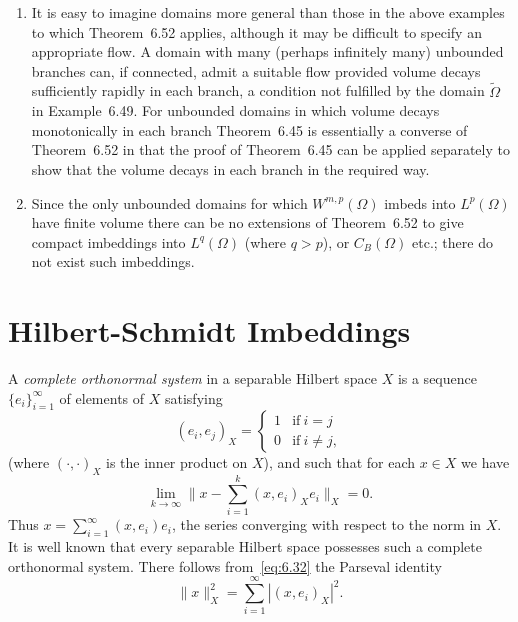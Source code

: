 \begin{remarks}
  \begin{enumerate}[1.]
    \item It is easy to imagine domains more general than those in the above examples
      to which Theorem~6.52 applies, although it may be difficult to specify
      an appropriate flow. A domain with many (perhaps infinitely many)
      unbounded branches can, if connected, admit a suitable flow provided
      volume decays sufficiently rapidly in each branch, a condition
      not fulfilled by the domain $\tilde\Omega$ in Example~6.49.
      For unbounded domains in which volume decays monotonically in each branch
      Theorem~6.45 is essentially a converse of Theorem~6.52 in that the proof
      of Theorem~6.45 can be applied separately to show that the volume decays
      in each branch in the required way.
    \item Since the only unbounded domains for which $W^{m,p}(\Omega)$ imbeds
      into $L^p(\Omega)$ have finite volume there can be no extensions of Theorem~6.52
      to give compact imbeddings into $L^q(\Omega)$ (where $q>p$), or $C_B(\Omega)$ etc.;
      there do not exist such imbeddings.
  \end{enumerate}
\end{remarks}


\section{Hilbert-Schmidt Imbeddings}

\begin{para}
  A \emph{complete orthonormal system} in a separable Hilbert space $X$
  is a sequence $\{e_i\}_{i=1}^\infty$ of elements of $X$ satisfying
  \[ (e_i,e_j)_X = \begin{cases}
    1 & \text{if}\ i=j \\
    0 & \text{if}\ i\neq j,
  \end{cases}\]
  (where $(\cdot,\cdot)_X$ is the inner product on $X$), and such that for
  each $x\in X$ we have
  \begin{equation}\label{eq:6.32}
    \lim_{k\to\infty} \biggl\| x - \sum_{i=1}^k (x,e_i)_X e_i \biggr\|_X = 0.
  \end{equation}
  Thus $x=\sum_{i=1}^\infty (x,e_i)e_i$, the series converging with respect to
  the norm in $X$. It is well known that every separable Hilbert space possesses
  such a complete orthonormal system. There follows from~\eqref{eq:6.32}
  the Parseval identity
  \[ \|x\|_X^2 = \sum_{i=1}^\infty |(x,e_i)_X|^2. \]
\end{para}


